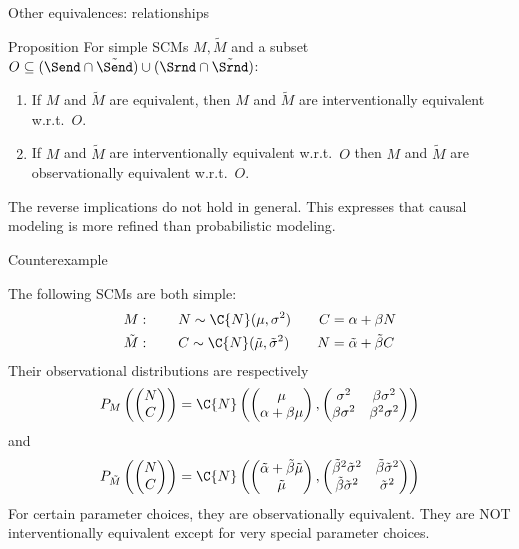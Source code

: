 \begin{frame}{Other equivalences: relationships}
\begin{block}{Proposition}
  For simple SCMs $M, \tilde{M}$ and a subset $O \subseteq (\Send \cap \tilde{\Send}) \cup (\Srnd \cap \tilde{\Srnd})$:
  \begin{enumerate}
    \item If $M$ and $\tilde{M}$ are equivalent, then 
      $M$ and $\tilde{M}$ are interventionally equivalent w.r.t.\ $O$.
    \item If $M$ and $\tilde{M}$ are interventionally equivalent w.r.t.\ $O$ then 
      $M$ and $\tilde{M}$ are observationally equivalent w.r.t.\ $O$.
  \end{enumerate}
\end{block}
The reverse implications do not hold in general. This expresses that causal modeling is more refined than probabilistic modeling.
\end{frame}

\begin{frame}{Counterexample}
\begin{example}
  The following SCMs are both simple:
  \begin{align*}
    M &: \qquad N \sim \C{N}(\mu,\sigma^2) \qquad C = \alpha + \beta N \\
    \tilde{M}&: \qquad C \sim \C{N}(\tilde{\mu},\tilde{\sigma}^2) \qquad N = \tilde{\alpha} + \tilde{\beta} C
  \end{align*}
Their observational distributions are respectively 
  $$P_M\left(\begin{pmatrix}N \\C\end{pmatrix}\right) = \C{N}\left(\begin{pmatrix} \mu \\ \alpha + \beta \mu \end{pmatrix}, \begin{pmatrix} \sigma^2 & \beta\sigma^2 \\ \beta\sigma^2 & \beta^2\sigma^2\end{pmatrix}\right)$$
and
  $$P_{\tilde{M}}\left(\begin{pmatrix}N\\C\end{pmatrix}\right) = \C{N}\left(\begin{pmatrix} \tilde{\alpha} + \tilde{\beta}\tilde{\mu} \\ \tilde{\mu} \end{pmatrix}, \begin{pmatrix} \tilde{\beta}^2\tilde{\sigma}^2 & \tilde{\beta}\tilde{\sigma}^2 \\ \tilde{\beta}\tilde{\sigma}^2 & \tilde{\sigma}^2\end{pmatrix}\right)$$
For certain parameter choices, they are observationally equivalent.
They are NOT interventionally equivalent except for very special parameter choices.
\end{example}
\end{frame}

